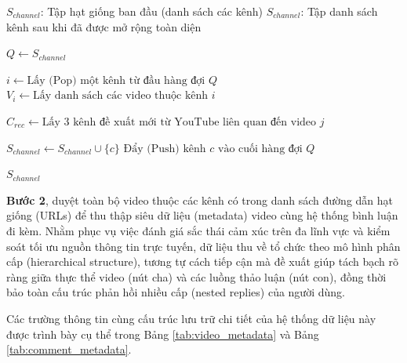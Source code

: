 \begin{algorithm}[H]
\caption{Thuật toán mở rộng tập dữ liệu kênh hạt giống dựa trên đề xuất của YouTube}
\label{alg:seed_channel_expansion}
\begin{algorithmic}[1]
\Require $S_{channel}$: Tập hạt giống ban đầu (danh sách các kênh)
\Ensure $S_{channel}$: Tập danh sách kênh sau khi đã được mở rộng toàn diện

\State $Q \gets S_{channel}$ 

 
    \State $i \gets \text{Lấy (Pop) một kênh từ đầu hàng đợi } Q$
    \State $V_i \gets \text{Lấy danh sách các video thuộc kênh } i$

     
        \State $C_{rec} \gets \text{Lấy 3 kênh đề xuất mới từ YouTube liên quan đến video } j$

             
                \State $S_{channel} \gets S_{channel} \cup \{c\}$ 
                \State $\text{Đẩy (Push) kênh } c \text{ vào cuối hàng đợi } Q$ 
            \EndIf
        \EndFor
    \EndFor
\EndWhile

\State \Return $S_{channel}$
\end{algorithmic}
\end{algorithm}

\textbf{Bước 2}, duyệt toàn bộ video thuộc các kênh có trong danh sách đường dẫn hạt giống (URLs) để thu thập siêu dữ liệu (metadata) video cùng hệ thống bình luận đi kèm. Nhằm phục vụ việc đánh giá sắc thái cảm xúc trên đa lĩnh vực và kiểm soát tối ưu nguồn thông tin trực tuyến, dữ liệu thu về tổ chức theo mô hình phân cấp (hierarchical structure), tương tự cách tiếp cận mà \textcite{ding2026scope} đề xuất giúp tách bạch rõ ràng giữa thực thể video (nút cha) và các luồng thảo luận (nút con), đồng thời bảo toàn cấu trúc phản hồi nhiều cấp (nested replies) của người dùng.

Các trường thông tin cùng cấu trúc lưu trữ chi tiết của hệ thống dữ liệu này được trình bày cụ thể trong Bảng \ref{tab:video_metadata} và Bảng \ref{tab:comment_metadata}.

